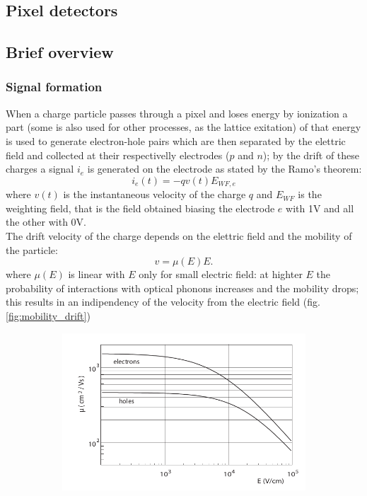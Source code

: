 \label{chip}
\begin{titlepage}

\section{Pixel detectors}

\subsection{Brief overview}
\subsubsection{Signal formation}
When a charge particle passes through a pixel and loses energy by ionization a part (some is also 
used for other processes, as the lattice exitation) of that
energy is used to generate electron-hole pairs which are then separated by the elettric field 
and collected at their respectivelly electrodes ($p$ and $n$); by the drift of these charges a 
signal $i_e$ is generated on the electrode as stated by the Ramo's theorem: 
\begin{equation}
   i_e(t) = -q v(t) E_{WF,e}
\end{equation}
where $v(t)$ is the instantaneous velocity of the charge $q$ and $E_{WF}$ is the weighting
field, that is the field obtained biasing the electrode $e$ with 1V and all the other with
0V.\\
The drift velocity of the charge depends on the elettric field and the mobility of the particle:
\begin{equation}
   v = \mu(E) E. 
\end{equation}
where $\mu(E)$ is linear with $E$ only for small electric field: at highter $E$ the probability
of interactions with optical phonons increases and the mobility drops; this results in an 
indipendency of the velocity from the electric field (fig. \ref{fig:mobility_drift})
\begin{figure}
   \begin{subfigure}{.5\textwidth}
     \centering
     \includegraphics[width=.8\linewidth]{figures/mobility_in_semiconductor.png}

\end{subfigure}
\end{figure}
\end{titlepage}
